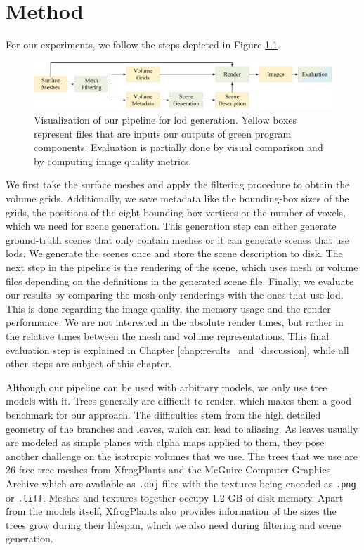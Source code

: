 \chapter{Method}
\label{chap:method}
For our experiments, we follow the steps depicted in Figure \ref{fig:pipeline}.
\begin{figure}[t]
    \centering
    \includegraphics[width=1.0\linewidth]{img/pipeline.png}
    \caption[Visualization of the pipeline the thesis built upon]{Visualization of our pipeline for \ac{lod} generation. Yellow boxes represent files that are inputs our outputs of green program components. Evaluation is partially done by visual comparison and by computing image quality metrics.}
    \label{fig:pipeline}
\end{figure}
We first take the surface meshes and apply the filtering procedure to obtain the volume grids.
Additionally, we save metadata like the bounding-box sizes of the grids, the positions of the eight bounding-box vertices or the number of voxels, which we need for scene generation.
This generation step can either generate ground-truth scenes that only contain meshes or it can generate scenes that use \acp{lod}.
We generate the scenes once and store the scene description to disk.
The next step in the pipeline is the rendering of the scene, which uses mesh or volume files depending on the definitions in the generated scene file.
Finally, we evaluate our results by comparing the mesh-only renderings with the ones that use \ac{lod}.
This is done regarding the image quality, the memory usage and the render performance.
We are not interested in the absolute render times, but rather in the relative times between the mesh and volume representations.
This final evaluation step is explained in Chapter \ref{chap:results_and_discussion}, while all other steps are subject of this chapter.

Although our pipeline can be used with arbitrary models, we only use tree models with it.
Trees generally are difficult to render, which makes them a good benchmark for our approach.
The difficulties stem from the high detailed geometry of the branches and leaves, which can lead to aliasing.
As leaves usually are modeled as simple planes with alpha maps applied to them, they pose another challenge on the isotropic volumes that we use.
The trees that we use are 26 free tree meshes from XfrogPlants \cite{xfrogplants} and the McGuire Computer Graphics Archive \cite{McGuire2017Data} which are available as \texttt{.obj} files with the textures being encoded as \texttt{.png} or \texttt{.tiff}.
Meshes and textures together occupy 1.2 GB of disk memory.
Apart from the models itself, XfrogPlants also provides information of the sizes the trees grow during their lifespan, which we also need during filtering and scene generation.


